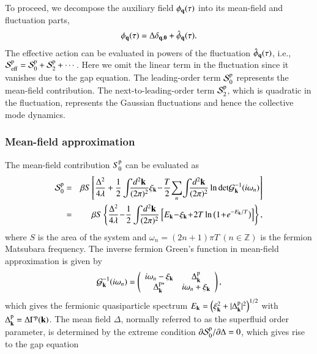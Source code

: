 \documentclass[aps,prd,amsmath,two column,nofootinbib,amssymb,referee]{revtex4}
\begin{document}
To proceed, we decompose the auxiliary field $\phi_{\bf q}(\tau)$ into its mean-field and fluctuation parts,
\begin{eqnarray}
\phi_{\bf q}(\tau)=\Delta\delta_{\bf q,0}+\hat\phi_{\bf q}(\tau).
\end{eqnarray}
The effective action can be evaluated in powers of the fluctuation $\hat\phi_{\bf q}(\tau)$, i.e., ${\cal S}_{\rm eff}^{\rm p}={\cal S}_0^{\rm p}+{\cal S}_2^{\rm p}+\cdots$. Here we omit the linear term in the fluctuation since it vanishes due to the gap equation. The leading-order term ${\cal S}_0^{\rm p}$ represents the mean-field contribution. The next-to-leading-order term ${\cal S}_2^{\rm p}$, which is quadratic in the fluctuation, represents the Gaussian fluctuations and hence the collective mode dynamics.

\subsubsection{Mean-field approximation}\label{sectionp1}
The mean-field contribution $S_0^{\rm p}$ can be evaluated as
\begin{eqnarray}
{\cal S}_0^{\rm p}&=&\beta S\left[{\Delta^2\over4\lambda}+{1\over2}\int\!\!\! {d^2{\bf k}\over(2\pi)^2}\xi_{\bf k}\!-\!{T\over2}\!\sum_{n}\!\int\!\!\! {d^2{\bf k}\over(2\pi)^2}\ln \text{det}{\cal G}^{-1}_{\bf k}(i\omega_n)\right]\nonumber\\
&=&{\beta S}\left\{{\Delta^2\over4\lambda}\!-\!\frac{1}{2}\int\!\!\!{d^2{\bf k}\over(2\pi)^2}\left[E_{\bf k}\!-\!\xi_{\bf k}\!+\!2T\ln\big(1\!+\!e^{-E_{\bf k}/T}\big)\right]\right\},
\end{eqnarray}
where $S$ is the area of the system and  $\omega_n=(2n+1)\pi T \ (n\in\mathbb{Z})$ is the fermion Matsubara frequency. The inverse fermion Green's function  in mean-field approximation is given by 
\begin{eqnarray}
{\cal G}^{-1}_{\bf k}(i\omega_n)=\left(\begin{array}{cc}
i\omega_n-\xi_{{\bf k}}&\Delta_{\bf k}^{\rm p}\\
\Delta_{\bf k}^{{\rm p}*}&i\omega_n+\xi_{{\bf k}}
\end{array}\right),
\end{eqnarray}
which gives the fermionic quasiparticle spectrum $E_{\bf k}=\left(\xi_{{\bf k}}^{2}+|\Delta_{\bf k}^{\rm p}|^2\right)^{1/2}$ with $\Delta_{\bf k}^{\rm p}=\Delta\Gamma^{\rm p}({\bf k})$.  The mean field $\Delta$, normally referred to as the superfluid order parameter, is determined by the extreme condition $\partial {\cal S}_0^{\rm p}/\partial\Delta=0$, which gives rise to the gap equation
\end{document}
